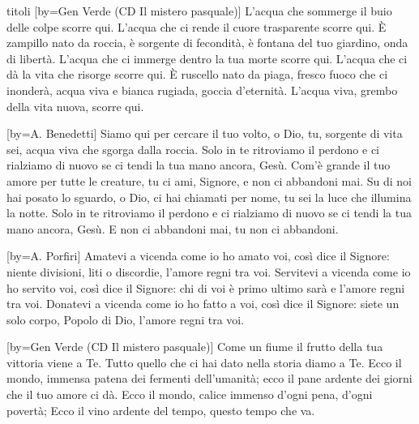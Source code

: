 \begin{songs}{titoli}
[by={Gen Verde (CD Il mistero pasquale)}]
\beginverse
L'acqua che sommerge il buio delle colpe scorre qui.
L'acqua che ci rende il cuore trasparente scorre qui.
È zampillo nato da roccia, è sorgente di fecondità,
è fontana del tuo giardino, onda di libertà.
L'acqua che ci immerge dentro la tua morte scorre qui.
L'acqua che ci dà la vita che risorge scorre qui.
È ruscello nato da piaga, fresco fuoco che ci inonderà,
acqua viva e bianca rugiada, goccia d'eternità.
L'acqua viva, grembo della vita nuova, scorre qui.
\endverse
\endsong

[by={A. Benedetti}]
\beginverse
Siamo qui
per cercare il tuo volto, o Dio,
tu, sorgente di vita sei,
acqua viva che sgorga dalla roccia.
Solo in te
ritroviamo il perdono e ci rialziamo di nuovo
se ci tendi la tua mano ancora, Gesù.
\endverse
\beginchorus
Com'è grande il tuo amore
per tutte le creature,
tu ci ami, Signore,
e non ci abbandoni mai. 
\endchorus
\beginverse
Su di noi
hai posato lo sguardo, o Dio,
ci hai chiamati per nome, tu
sei la luce che illumina la notte.
Solo in te
ritroviamo il perdono e ci rialziamo di nuovo
se ci tendi la tua mano ancora, Gesù.
\endverse
\beginverse*
E non ci abbandoni mai,
tu non ci abbandoni.
\endverse
\endsong

[by={A. Porfiri}]
\beginverse
Amatevi a vicenda come io ho amato voi,
così dice il Signore:
niente divisioni, liti o discordie,
l'amore regni tra voi.
\endverse
\beginverse
Servitevi a vicenda come io ho servito voi,
così dice il Signore:
chi di voi è primo ultimo sarà
e l'amore regni tra voi.
\endverse
\beginverse
Donatevi a vicenda come io ho fatto a voi,
così dice il Signore:
siete un solo corpo, Popolo di Dio,
l'amore regni tra voi.
\endverse
\endsong

[by={Gen Verde (CD Il mistero pasquale)}]
\beginverse
Come un fiume il frutto della tua vittoria
viene a Te.
Tutto quello che ci hai dato nella storia
diamo a Te.
Ecco il mondo, immensa patena
dei fermenti dell'umanità;
ecco il pane ardente dei giorni
che il tuo amore ci dà.
Ecco il mondo, calice immenso
d'ogni pena, d'ogni povertà;
Ecco il vino ardente del tempo,
questo tempo che va.
\endverse
\endsong


\end{songs}

